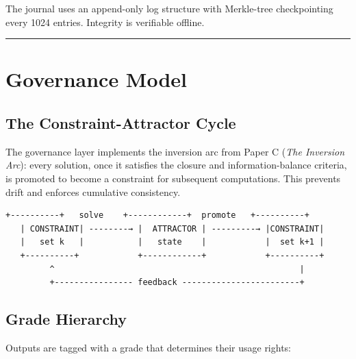 \documentclass[11pt,a4paper]{article}
\begin{document}
The journal uses an append-only log structure with Merkle-tree
checkpointing every 1024 entries. Integrity is verifiable offline.

\begin{center}\rule{0.5\linewidth}{0.5pt}\end{center}

\hypertarget{governance-model}{%
\section{Governance Model}\label{governance-model}}

\hypertarget{the-constraint-attractor-cycle}{%
\subsection{The Constraint-Attractor
Cycle}\label{the-constraint-attractor-cycle}}

The governance layer implements the inversion arc from Paper C
(\textit{The Inversion Arc}): every solution, once it satisfies the closure and
information-balance criteria, is promoted to become a constraint for
subsequent computations. This prevents drift and enforces cumulative
consistency.

\begin{Verbatim}[breaklines=true,breakanywhere=true]
   +----------+   solve    +------------+  promote   +----------+
   | CONSTRAINT| --------→ |  ATTRACTOR | ---------→ |CONSTRAINT|
   |   set k   |           |   state    |            |  set k+1 |
   +----------+            +------------+            +----------+
         ^                                                  |
         +---------------- feedback ------------------------+
\end{Verbatim}

\hypertarget{grade-hierarchy}{%
\subsection{Grade Hierarchy}\label{grade-hierarchy}}

Outputs are tagged with a grade that determines their usage rights:
\end{document}
